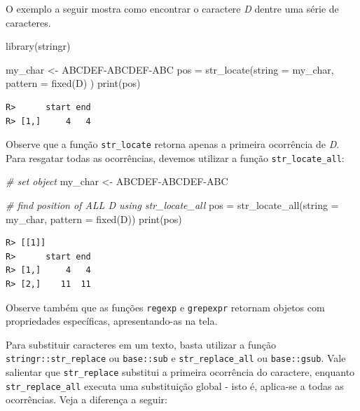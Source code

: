 \documentclass[
  11pt,
]{book}
\newenvironment{Shaded}{\begin{snugshade}}{\end{snugshade}}
\newcommand{\AttributeTok}[1]{\textcolor[rgb]{0.61,0.61,0.61}{#1}}
\newcommand{\CommentTok}[1]{\textcolor[rgb]{0.37,0.37,0.37}{\textit{#1}}}
\newcommand{\FunctionTok}[1]{\textcolor[rgb]{0,0,0}{#1}}
\newcommand{\NormalTok}[1]{#1}
\newcommand{\OtherTok}[1]{\textcolor[rgb]{0.37,0.37,0.37}{#1}}
\newcommand{\StringTok}[1]{\textcolor[rgb]{0.5,0.5,0.5}{#1}}
\begin{document}
O exemplo a seguir mostra como encontrar o caractere \emph{D} dentre uma série de caracteres.

\begin{Shaded}
\begin{Highlighting}[]
\FunctionTok{library}\NormalTok{(stringr)}

\NormalTok{my\_char }\OtherTok{\textless{}{-}} \StringTok{\textquotesingle{}ABCDEF{-}ABCDEF{-}ABC\textquotesingle{}}
\NormalTok{pos }\OtherTok{=} \FunctionTok{str\_locate}\NormalTok{(}\AttributeTok{string =}\NormalTok{ my\_char, }\AttributeTok{pattern =} \FunctionTok{fixed}\NormalTok{(}\StringTok{\textquotesingle{}D\textquotesingle{}}\NormalTok{) )}
\FunctionTok{print}\NormalTok{(pos)}
\end{Highlighting}
\end{Shaded}

\begin{verbatim}
R>      start end
R> [1,]     4   4
\end{verbatim}

Observe que a função \texttt{str\_locate} retorna apenas a primeira ocorrência de \emph{D}. Para resgatar todas as ocorrências, devemos utilizar a função \texttt{str\_locate\_all}:

\begin{Shaded}
\begin{Highlighting}[]
\CommentTok{\# set object}
\NormalTok{my\_char }\OtherTok{\textless{}{-}} \StringTok{\textquotesingle{}ABCDEF{-}ABCDEF{-}ABC\textquotesingle{}}

\CommentTok{\# find position of ALL \textquotesingle{}D\textquotesingle{} using str\_locate\_all}
\NormalTok{pos }\OtherTok{=} \FunctionTok{str\_locate\_all}\NormalTok{(}\AttributeTok{string =}\NormalTok{ my\_char, }\AttributeTok{pattern =} \FunctionTok{fixed}\NormalTok{(}\StringTok{\textquotesingle{}D\textquotesingle{}}\NormalTok{))}
\FunctionTok{print}\NormalTok{(pos)}
\end{Highlighting}
\end{Shaded}

\begin{verbatim}
R> [[1]]
R>      start end
R> [1,]     4   4
R> [2,]    11  11
\end{verbatim}

Observe também que as funções \texttt{regexp} e \texttt{grepexpr} retornam objetos com propriedades específicas, apresentando-as na tela.

Para substituir caracteres em um texto, basta utilizar a função \texttt{stringr::str\_replace} ou \texttt{base::sub} e \texttt{str\_replace\_all} ou \texttt{base::gsub}. Vale salientar que \texttt{str\_replace} substitui a primeira ocorrência do caractere, enquanto \texttt{str\_replace\_all} executa uma substituição global - isto é, aplica-se a todas as ocorrências. Veja a diferença a seguir:  
\end{document}

